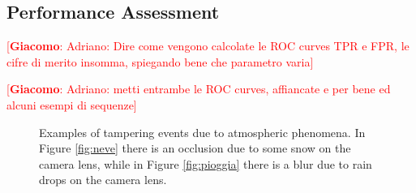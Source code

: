 \documentclass{llncs}
\newcommand{\gi}[1]{{\textcolor{red}{[\small \textbf{Giacomo}: #1]}}}
\begin{document}
\subsection{Performance Assessment}
\gi{Adriano: Dire come vengono calcolate le ROC curves TPR e FPR, le cifre di merito insomma, spiegando bene che parametro varia}

\gi{Adriano: metti entrambe le ROC curves, affiancate e per bene ed alcuni esempi di sequenze}

\begin{figure}
	\centering
	\caption[Tampering examples]{Examples of tampering events due to atmospheric phenomena. In Figure \ref{fig:neve} there is an occlusion due to some snow on the camera lens, while in Figure \ref{fig:pioggia} there is a blur due to rain drops on the camera lens.}
	\label{fig:ROC}
\end{figure}
\end{document}

